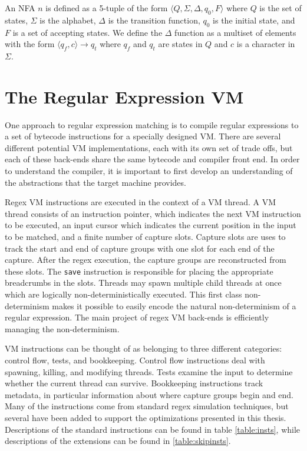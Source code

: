 An NFA $n$ is defined as a 5-tuple of the form
$\langle Q, \Sigma, \Delta, q_0, F \rangle$ where $Q$ is the
set of states, $\Sigma$ is the alphabet, $\Delta$ is the transition
function, $q_0$ is the initial state, and $F$ is a set of accepting
states. We define the $\Delta$ function as a multiset of elements
with the form $\langle q_f, c \rangle \rightarrow q_t$ where
$q_f$ and $q_t$ are states in $Q$ and $c$ is a character in $\Sigma$.

\section{The Regular Expression VM}
\label{section:vm}

One approach to regular expression matching is to compile regular expressions
to a set of bytecode instructions for a specially designed VM. There
are several different potential VM implementations, each with its own
set of trade offs, but each of these back-ends share the same bytecode
and compiler front end. In order to understand the compiler, it
is important to first develop an understanding of the abstractions
that the target machine provides.

Regex VM instructions are executed in the context of a VM thread.
A VM thread consists of an instruction pointer, which indicates
the next VM instruction to be executed, an input cursor which
indicates the current position in the input to be matched, and
a finite number of capture slots. Capture slots are uses to
track the start and end of capture groups with one slot for each
end of the capture. After the regex execution, the capture groups
are reconstructed from these slots. The \verb'save' instruction is
responsible for placing the appropriate breadcrumbs in the slots.
Threads may spawn multiple child threads at once which are logically
non-deterministically executed. This first class non-determinism 
makes it possible to easily encode the natural non-determinism of
a regular expression. The main project of regex VM back-ends is
efficiently managing the non-determinism.

VM instructions can be thought of as belonging to three different categories:
control flow, tests, and bookkeeping. Control flow instructions deal with
spawning, killing, and modifying threads. Tests examine the input to determine
whether the current thread can survive. Bookkeeping instructions track metadata,
in particular information about where capture groups begin and end.
Many of the instructions come from standard regex simulation
techniques, but several have been added to support the optimizations
presented in this thesis. Descriptions of the standard instructions 
can be found in table \ref{table:insts}, while descriptions of the
extensions can be found in \ref{table:skipinsts}.

